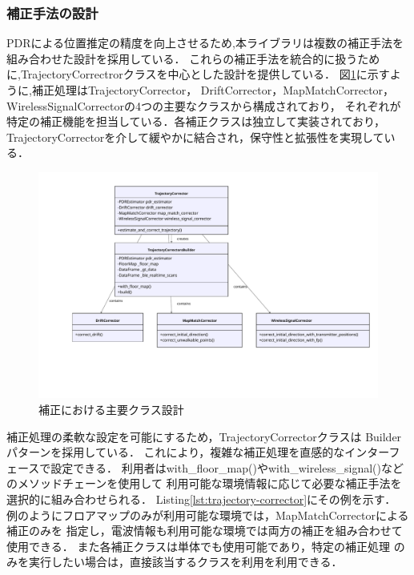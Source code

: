 
\subsubsection{補正手法の設計}


PDRによる位置推定の精度を向上させるため,本ライブラリは複数の補正手法を
組み合わせた設計を採用している．
これらの補正手法を統合的に扱うために,TrajectoryCorrectrorクラスを中心とした設計を提供している．
図\ref{fig:corrector-class}に示すように,補正処理はTrajectoryCorrector，
DriftCorrector，MapMatchCorrector，WirelessSignalCorrectorの4つの主要なクラスから構成されており，
それぞれが特定の補正機能を担当している．各補正クラスは独立して実装されており，
TrajectoryCorrectorを介して緩やかに結合され，保守性と拡張性を実現している．

\begin{figure}[H]
    \centering
    \includegraphics[width=\linewidth]{../image/trajectory_corrector.pdf}
    \caption{補正における主要クラス設計}
    \label{fig:corrector-class}
\end{figure}

補正処理の柔軟な設定を可能にするため，TrajectoryCorrectorクラスは
Builderパターンを採用している．
これにより，複雑な補正処理を直感的なインターフェースで設定できる．
利用者はwith\_floor\_map()やwith\_wireless\_signal()などのメソッドチェーンを使用して
利用可能な環境情報に応じて必要な補正手法を選択的に組み合わせられる．
Listing\ref{lst:trajectory-corrector}にその例を示す．
例のようにフロアマップのみが利用可能な環境では，MapMatchCorrectorによる補正のみを
指定し，電波情報も利用可能な環境では両方の補正を組み合わせて使用できる．
また各補正クラスは単体でも使用可能であり，特定の補正処理
のみを実行したい場合は，直接該当するクラスを利用を利用できる．

